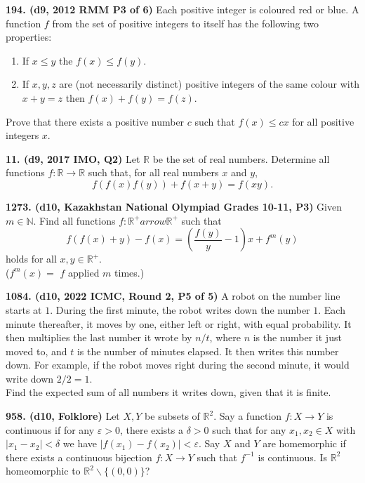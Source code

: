 \documentclass{article}
\begin{document}
\textbf{194. (\color{red}d9\color{black}, 2012 RMM P3 of 6)} Each positive integer is coloured red or blue. A function $f$ from the set of positive integers to itself has the following two properties: \begin{enumerate} \item If $x \leq y$ the $f(x) \leq f(y).$ \item If $x, y, z$ are (not necessarily distinct) positive integers of the same colour with $x + y = z$ then $f(x) + f(y) = f(z).$ \end{enumerate} Prove that there exists a positive number $c$ such that $f(x) \leq cx$ for all positive integers $x.$

\textbf{11. (\color{red}d9\color{black}, 2017 IMO, Q2)} Let $\mathbb{R}$ be the set of real numbers. Determine all functions $f : \mathbb{R} \to \mathbb{R}$ such that, for all real numbers $x$ and $y$, \[f(f(x)f(y)) + f(x + y) = f(xy).\]

\textbf{1273. (\color{red}d10\color{black}, Kazakhstan National Olympiad Grades 10-11, P3)} Given $m\in\mathbb{N}$. Find all functions $f:\mathbb{R^{+}}arrow\mathbb{R^{+}}$ such that$$f(f(x)+y)-f(x)=( \frac{f(y)}{y}-1)x+f^m(y)$$holds for all $x,y\in\mathbb{R^{+}}.$\\

($f^m(x) =$ $f$ applied $m$ times.)

\textbf{1084. (\color{red}d10\color{black}, 2022 ICMC, Round 2, P5 of 5)} A robot on the number line starts at $1$.  During the first minute, the robot writes down the number $1$. Each minute thereafter, it moves by one, either left or right, with equal probability. It then multiplies the last number it wrote by $n/t$, where $n$ is the number it just moved to, and $t$ is the number of minutes elapsed.  It then writes this number down.  For example, if the robot moves right during the second minute, it would write down $2/2=1$.\\[6pt]

Find the expected sum of all numbers it writes down, given that it is finite.

\textbf{958. (\color{red}d10\color{black}, Folklore)} Let $X, Y$ be subsets of $\mathbb{R}^2$. Say a function $f : X \to Y$ is continuous if for any $\varepsilon > 0$, there exists a $\delta > 0$ such that for any $x_1, x_2 \in X$ with $|x_1 - x_2| < \delta$ we have $|f(x_1) - f(x_2)| < \varepsilon$. Say $X$ and $Y$ are homemorphic if there exists a continuous bijection $f : X \to Y$ such that $f^{-1}$ is continuous. Is $\mathbb{R}^2$ homeomorphic to $\mathbb{R}^2 \backslash \{(0,0)\}$?
\end{document}
